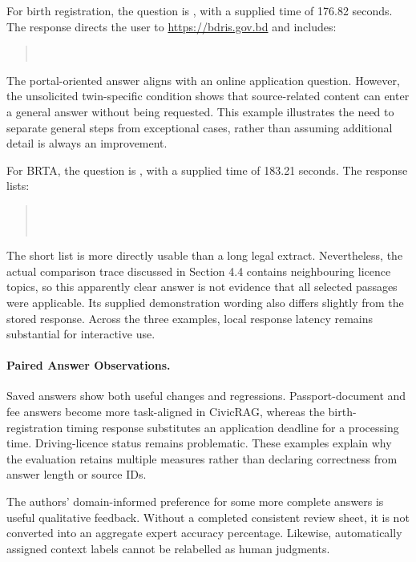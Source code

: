 For birth registration, the question is , with a supplied time of 176.82 seconds. The response directs the user to \url{https://bdris.gov.bd} and includes:
\begin{quote}
\\
\end{quote}
The portal-oriented answer aligns with an online application question. However, the unsolicited twin-specific condition shows that source-related content can enter a general answer without being requested. This example illustrates the need to separate general steps from exceptional cases, rather than assuming additional detail is always an improvement.

For BRTA, the question is , with a supplied time of 183.21 seconds. The response lists:
\begin{quote}
\\
\\
\end{quote}
The short list is more directly usable than a long legal extract. Nevertheless, the actual comparison trace discussed in Section 4.4 contains neighbouring licence topics, so this apparently clear answer is not evidence that all selected passages were applicable. Its supplied demonstration wording also differs slightly from the stored response. Across the three examples, local response latency remains substantial for interactive use.

\paragraph{Paired Answer Observations.}
Saved answers show both useful changes and regressions. Passport-document and fee answers become more task-aligned in CivicRAG, whereas the birth-registration timing response substitutes an application deadline for a processing time. Driving-licence status remains problematic. These examples explain why the evaluation retains multiple measures rather than declaring correctness from answer length or source IDs.

The authors' domain-informed preference for some more complete answers is useful qualitative feedback. Without a completed consistent review sheet, it is not converted into an aggregate expert accuracy percentage. Likewise, automatically assigned context labels cannot be relabelled as human judgments.


